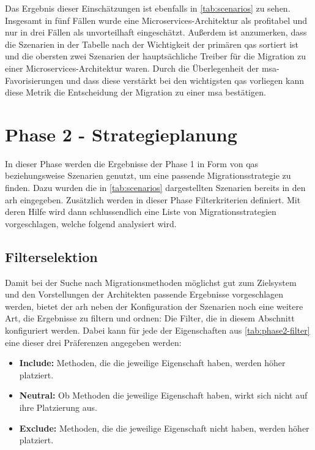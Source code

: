 Das Ergebnis dieser Einschätzungen ist ebenfalls in \cref{tab:scenarios} zu sehen.
Insgesamt in fünf Fällen wurde eine Microservices-Architektur als profitabel und nur in drei Fällen als unvorteilhaft eingeschätzt. 
Außerdem ist anzumerken, dass die Szenarien in der Tabelle nach der Wichtigkeit der primären \glspl{qa} sortiert ist und die obersten zwei Szenarien der hauptsächliche Treiber für die Migration zu einer Microservices-Architektur waren.
Durch die Überlegenheit der \gls{msa}-Favorisierungen und dass diese verstärkt bei den wichtigsten \glspl{qa} vorliegen kann diese Metrik die Entscheidung der Migration zu einer \gls{msa} bestätigen.

\section{Phase 2 - Strategieplanung}
\label{sec:durchführung-phase2}

In dieser Phase werden die Ergebnisse der Phase 1 in Form von \glspl{qa} beziehungsweise Szenarien genutzt, um eine passende Migrationsstrategie zu finden.
Dazu wurden die in \cref{tab:scenarios} dargestellten Szenarien bereits in den \gls{arh} eingegeben.
Zusätzlich werden in dieser Phase Filterkriterien definiert.
Mit deren Hilfe wird dann schlussendlich eine Liste von Migrationsstrategien vorgeschlagen, welche folgend analysiert wird.

\subsection{Filterselektion}
Damit bei der Suche nach Migrationsmethoden möglichst gut zum Zielsystem und den Vorstellungen der Architekten passende Ergebnisse vorgeschlagen werden, bietet der \gls{arh} neben der Konfiguration der Szenarien noch eine weitere Art, die Ergebnisse zu filtern und ordnen: Die Filter, die in diesem Abschnitt konfiguriert werden.
Dabei kann für jede der Eigenschaften aus \cref{tab:phase2-filter} eine dieser drei Präferenzen angegeben werden:
\begin{itemize}
	\item \textbf{Include:} Methoden, die die jeweilige Eigenschaft haben, werden höher platziert.
	\item \textbf{Neutral:} Ob Methoden die jeweilige Eigenschaft haben, wirkt sich nicht auf ihre Platzierung aus.
	\item \textbf{Exclude:} Methoden, die die jeweilige Eigenschaft nicht haben, werden höher platziert.
\end{itemize}


